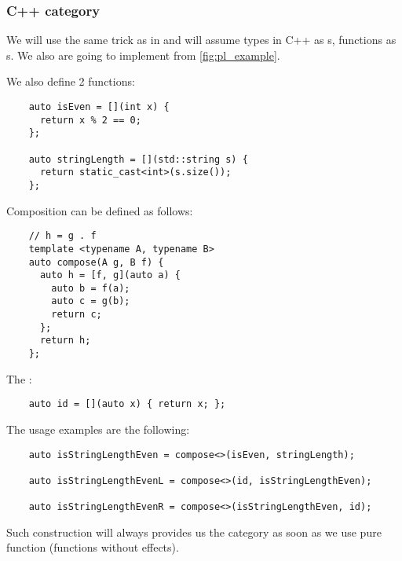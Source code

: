 \subsubsection{\textbf{C++} category}
\begin{example}
  \label{ex:cppcategory}
  We will use the same trick as in  and
  will assume 
  types in C++ as s, 
  functions as s.
  We also are going to implement
   from \cref{fig:pl_example}.


  We  also define 2 functions:
  \begin{verbatim}
    auto isEven = [](int x) { 
      return x % 2 == 0; 
    };

    auto stringLength = [](std::string s) { 
      return static_cast<int>(s.size()); 
    };
  \end{verbatim}

  Composition can be defined as follows:
  \begin{verbatim}
    // h = g . f
    template <typename A, typename B> 
    auto compose(A g, B f) {
      auto h = [f, g](auto a) {
        auto b = f(a);
        auto c = g(b);
        return c;
      };
      return h;
    };
  \end{verbatim}

  The :
  \begin{verbatim}
    auto id = [](auto x) { return x; };
  \end{verbatim}

  The usage examples are the following:
  \begin{verbatim}
    auto isStringLengthEven = compose<>(isEven, stringLength);

    auto isStringLengthEvenL = compose<>(id, isStringLengthEven);

    auto isStringLengthEvenR = compose<>(isStringLengthEven, id);  
  \end{verbatim}

  Such construction will always provides us the category as soon as we
  use pure function (functions without effects).
\end{example}

